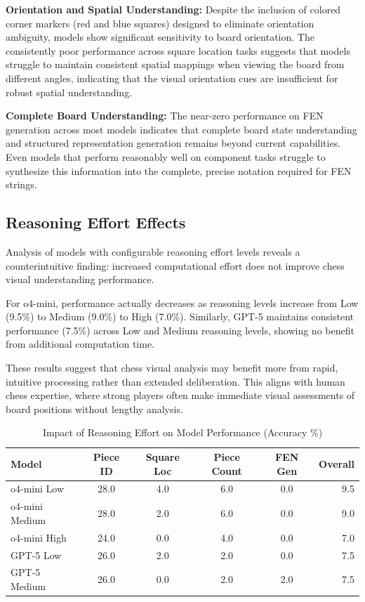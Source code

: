\documentclass{article}
\begin{document}
\textbf{Orientation and Spatial Understanding:} Despite the inclusion of colored corner markers (red and blue squares) designed to eliminate orientation ambiguity, models show significant sensitivity to board orientation. The consistently poor performance across square location tasks suggests that models struggle to maintain consistent spatial mappings when viewing the board from different angles, indicating that the visual orientation cues are insufficient for robust spatial understanding.

\textbf{Complete Board Understanding:} The near-zero performance on FEN generation across most models indicates that complete board state understanding and structured representation generation remains beyond current capabilities. Even models that perform reasonably well on component tasks struggle to synthesize this information into the complete, precise notation required for FEN strings.

\subsection{Reasoning Effort Effects}

Analysis of models with configurable reasoning effort levels reveals a counterintuitive finding: increased computational effort does not improve chess visual understanding performance. 

For o4-mini, performance actually decreases as reasoning levels increase from Low (9.5\%) to Medium (9.0\%) to High (7.0\%). Similarly, GPT-5 maintains consistent performance (7.5\%) across Low and Medium reasoning levels, showing no benefit from additional computation time.

These results suggest that chess visual analysis may benefit more from rapid, intuitive processing rather than extended deliberation. This aligns with human chess expertise, where strong players often make immediate visual assessments of board positions without lengthy analysis.

\begin{table}[h]
\centering
\caption{Impact of Reasoning Effort on Model Performance (Accuracy \%)}
\label{tab:reasoning_results}
\begin{tabular}{lccccr}
\toprule
Model & Piece ID & Square Loc & Piece Count & FEN Gen & Overall \\
\midrule
o4-mini Low & 28.0 & 4.0 & 6.0 & 0.0 & 9.5 \\
o4-mini Medium & 28.0 & 2.0 & 6.0 & 0.0 & 9.0 \\
o4-mini High & 24.0 & 0.0 & 4.0 & 0.0 & 7.0 \\
\midrule
GPT-5 Low & 26.0 & 2.0 & 2.0 & 0.0 & 7.5 \\
GPT-5 Medium & 26.0 & 0.0 & 2.0 & 2.0 & 7.5 \\
\bottomrule
\end{tabular}
\end{table}
\end{document}
